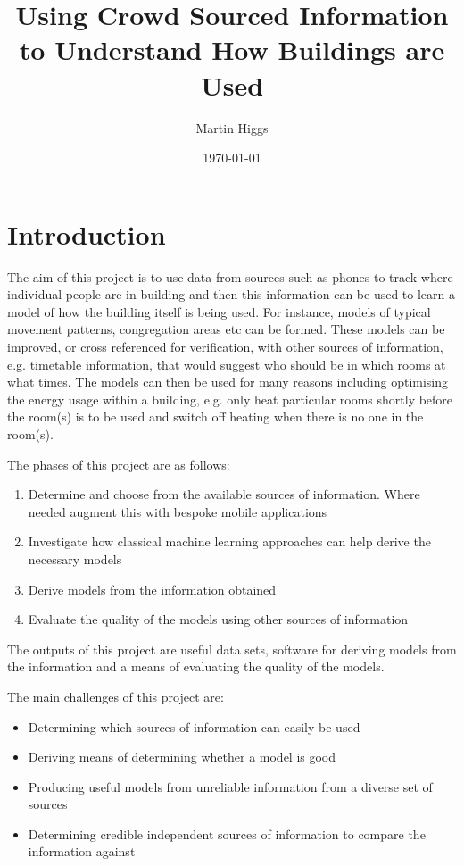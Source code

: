 \documentclass{UoYCSproject}
\title{Using Crowd Sourced Information to Understand How Buildings are Used}
\author{Martin Higgs}
\date{\today}
\begin{document}
	
	\maketitle
	
	\chapter{Introduction}
    
		The aim of this project is to use data from sources such as phones to track where individual people are in building and then this information can be used to learn a model of how the building itself is being used. For instance, models of typical movement patterns, congregation areas etc can be formed. These models can be improved, or cross referenced for verification, with other sources of information, e.g. timetable information, that would suggest who should be in which rooms at what times. The models can then be used for many reasons including optimising the energy usage within a building, e.g. only heat particular rooms shortly before the room(s) is to be used and switch off heating when there is no one in the room(s).
		
		The phases of this project are as follows:
		\begin{enumerate}
			\item Determine and choose from the available sources of information. Where needed augment this with bespoke mobile applications
			\item Investigate how classical machine learning approaches can help derive the necessary models
			\item Derive models from the information obtained
			\item Evaluate the quality of the models using other sources of information
		\end{enumerate}
		The outputs of this project are useful data sets, software for deriving models from the information and a means of evaluating the quality of the models.
		
		The main challenges of this project are:
		\begin{itemize}
			\item Determining which sources of information can easily be used
			\item Deriving means of determining whether a model is good
			\item Producing useful models from unreliable information from a diverse set of sources
			\item Determining credible independent sources of information to compare the information against
		\end{itemize}
        
\end{document}
